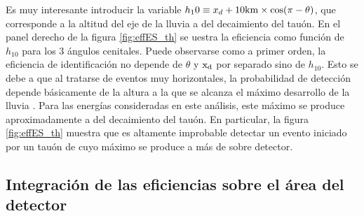 	Es muy interesante introducir la variable $h_10\equiv x_d + 10{\rm km} \times\cos(\pi-\theta)$, que corresponde a la altitud del eje de la lluvia a  del decaimiento del tauón.
	En el panel derecho de la figura \ref{fig:effES_th} se uestra la eficiencia como función de $h_{10}$ para los 3 ángulos cenitales.
	Puede observarse como a primer orden, la eficiencia de identificación no depende de $\theta$ y ${\rm x_d}$ por separado sino de $h_{10}$.
	Esto se debe a que al tratarse de eventos muy horizontales, la probabilidad de detección depende básicamente de la altura a la que se alcanza el máximo desarrollo de la lluvia \cite{verTesisYann125}.
	Para las energías consideradas en este análisis, este máximo se produce aproximadamente a  del decaimiento del tauón.
	En particular, la figura \ref{fig:effES_th} muestra que es altamente improbable detectar un evento iniciado por un tauón de  cuyo máximo se produce a más de  sobre detector.
	 
	
	\subsection{Integración de las eficiencias sobre el área del detector}
	
